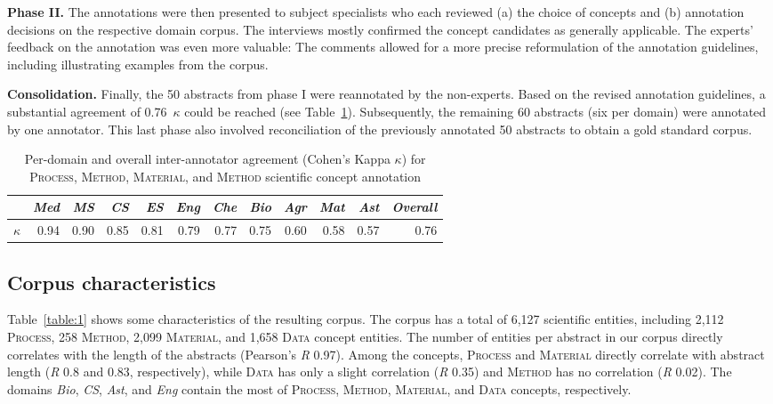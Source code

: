 \documentclass[runningheads]{llncs}
\begin{document}
\textbf{Phase II.} The annotations were then presented to subject specialists who each reviewed (a) the choice of concepts and (b) annotation decisions on the respective domain corpus. The interviews mostly confirmed the concept candidates as generally applicable. 
The experts' feedback on the annotation was even more valuable: The comments allowed for a more precise reformulation of the annotation guidelines, including illustrating examples from the corpus. 

\textbf{Consolidation. }
Finally, the 50 abstracts from phase I were reannotated by the non-experts. 
Based on the revised annotation guidelines,  
a substantial agreement of 0.76~$\kappa$ could be reached (see Table~\ref{table:2}).
Subsequently, the remaining 60 abstracts (six per domain) were annotated by one annotator. 
This last phase also involved reconciliation of the previously annotated 50 abstracts to obtain a gold standard corpus.

\begin{table}[htb]
\centering
\caption{Per-domain and overall inter-annotator agreement (Cohen's Kappa $\kappa$) for \textsc{Process}, \textsc{Method}, \textsc{Material}, and \textsc{Method} scientific concept annotation}
\begin{tabular}{l|rrrrrrrrrr|r}
	& \textit{Med}	&\textit{MS}	&\textit{CS}	&\textit{ES}	&\textit{Eng}	&\textit{Che}	&\textit{Bio}	&\textit{Agr}	&\textit{Mat}	&\textit{Ast} &\textit{Overall} \\ \hline
$\kappa$	& 0.94 & 0.90 & 0.85 & 0.81 & 0.79 & 0.77 & 0.75 & 0.60 & 0.58 & 0.57 & 0.76 
\end{tabular}
\label{table:2}
\end{table}



\subsection{Corpus characteristics}
Table~\ref{table:1} shows some characteristics of the resulting corpus. 
The corpus has a total of 6,127 scientific entities, including 2,112 \textsc{Process}, 258 \textsc{Method}, 2,099 \textsc{Material}, and 1,658 \textsc{Data} concept entities. The number of entities per abstract in our corpus directly correlates with the length of the abstracts (Pearson's \textit{R} 0.97). 
Among the concepts, \textsc{Process} and \textsc{Material} directly correlate with abstract length (\textit{R} 0.8 and 0.83, respectively), while \textsc{Data} has only a slight correlation (\textit{R} 0.35) and \textsc{Method} has no correlation (\textit{R} 0.02). 
The domains \textit{Bio}, \textit{CS}, \textit{Ast}, and \textit{Eng} contain the most of \textsc{Process}, \textsc{Method}, \textsc{Material}, and \textsc{Data} concepts, respectively.
\end{document}
